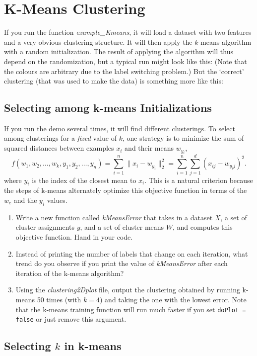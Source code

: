 \documentclass{article}
\def\blu#1{{\color{blu}#1}}
\def\norm#1{\|#1\|}
\def\enum#1{\begin{enumerate}#1\end{enumerate}}
\begin{document}
\section{K-Means Clustering}

If you run the function \emph{example\_Kmeans}, it will load a dataset with two features and a very obvious clustering structure. It will then apply the $k$-means algorithm with a random initialization. The result of applying the algorithm will thus depend on the randomization, but a typical run might look like this:
(Note that the colours are arbitrary due to the label switching problem.)
But the `correct' clustering (that was used to make the data) is something more like this:

\subsection{Selecting among k-means Initializations}

If you run the demo several times, it will find different clusterings. To select among clusterings for a \emph{fixed} value of $k$, one strategy is to minimize the sum of squared distances between examples $x_i$ and their means $w_{y_i}$,
\[
f(w_1,w_2,\dots,w_k,y_1,y_2,\dots,y_n) = \sum_{i=1}^n \norm{x_i - w_{y_i}}_2^2 = \sum_{i=1}^n \sum_{j=1}^d (x_{ij} - w_{y_ij})^2.
\]
 where $y_i$ is the index of the closest mean to $x_i$. This is a natural criterion because the steps of k-means alternately optimize this objective function in terms of the $w_c$ and the $y_i$ values.
 
 \blu{\enum{
 \item Write a new function called \emph{kMeansError} that takes in a dataset $X$, a set of cluster assignments $y$, and a set of cluster means $W$, and computes this objective function. Hand in your code.
 \item Instead of printing the number of labels that change on each iteration, what trend do you observe if you print the value of \emph{kMeansError} after each iteration of the k-means algorithm?
 \item Using the \emph{clustering2Dplot} file, output the clustering obtained by running k-means 50 times (with $k=4$) and taking the one with the lowest error. Note that the k-means training function will run much faster if you set \texttt{doPlot = false} or just remove this argument.
 }}
 
 \subsection{Selecting $k$ in k-means}
 
\end{document}
